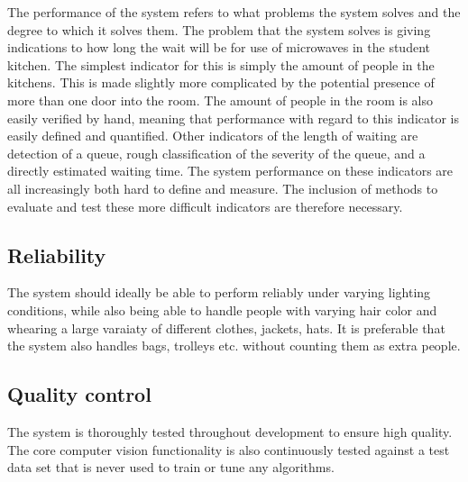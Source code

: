 The performance of the system refers to what problems the system solves and the degree to which it solves them. The problem that the system solves is giving indications to how long the wait will be for use of microwaves in the student kitchen. The simplest indicator for this is simply the amount of people in the kitchens. This is made slightly more complicated by the potential presence of more than one door into the room. The amount of people in the room is also easily verified by hand, meaning that performance with regard to this indicator is easily defined and quantified. Other indicators of the length of waiting are detection of a queue, rough classification of the severity of the queue, and a directly estimated waiting time. The system performance on these indicators are all increasingly both hard to define and measure. The inclusion of methods to evaluate and test these more difficult indicators are therefore necessary.

\subsection{Reliability}
The system should ideally be able to perform reliably under varying lighting conditions, while also being able to handle people with varying hair color and whearing a large varaiaty of different clothes, jackets, hats. It is preferable that the system also handles bags, trolleys etc. without counting them as extra people. 

\subsection{Quality control}
The system is thoroughly tested throughout development to ensure high quality. The core computer vision functionality is also continuously tested against a test data set that is never used to train or tune any algorithms. 
\newpage

